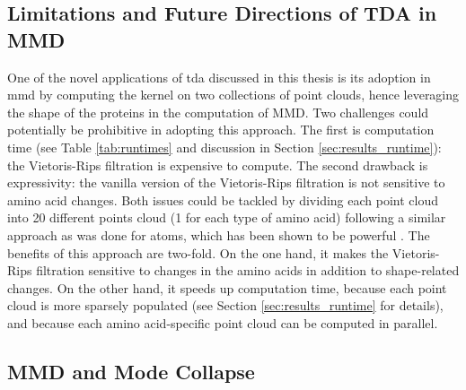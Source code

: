 

\subsection{Limitations and Future Directions of TDA in MMD}\label{sec:tda_limitations}

One of the novel applications of \acrshort{tda} discussed in this thesis is its
adoption in \acrshort{mmd} by computing the kernel on two collections of point
clouds, hence leveraging the shape of the proteins in the computation of MMD.
Two challenges could potentially be prohibitive in adopting this approach. The
first is computation time (see Table \ref{tab:runtimes} and discussion in
Section \ref{sec:results_runtime}): the Vietoris-Rips filtration is expensive
to compute. The second drawback is expressivity: the vanilla version of the
Vietoris-Rips filtration is not sensitive to amino acid changes. Both issues
could be tackled by dividing each point cloud into 20 different points cloud (1
for each type of amino acid) following a similar approach as was done for atoms,
which has been shown to be powerful \citep{jiang2021topological}. The benefits
of this approach are two-fold. On the one hand, it makes the Vietoris-Rips
filtration sensitive to changes in the amino acids in addition to shape-related
changes. On the other hand, it speeds up computation time, because each point
cloud is more sparsely populated (see Section \ref{sec:results_runtime} for
details), and because each amino acid-specific point cloud can be computed in
parallel.


\subsection{MMD and  Mode Collapse}\label{sec:mode_collapse_mode_drop}

